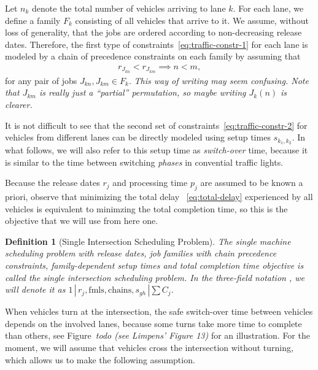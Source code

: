 \documentclass{article}
\theoremstyle{definition}
\theoremstyle{plain}
\newtheorem{define}{Definition}[section]
\begin{document}
Let $n_{k}$ denote the total number of vehicles arriving to lane $k$. For each
lane, we define a family $F_{k}$ consisting of all vehicles that arrive to it.
We assume, without loss of generality, that the jobs are ordered according to
non-decreasing release dates. Therefore, the first type of
constraints~\eqref{eq:traffic-constr-1} for each lane is modeled by a chain
of precedence constraints on each family by assuming that
\begin{align*}
  r_{J_{kn}} < r_{J_{km}} \implies n < m ,
\end{align*}
for any pair of jobs $J_{kn}, J_{km} \in F_{k}$. \textit{\color{blue}This way of writing may seem confusing. Note that $J_{km}$ is really just a ``partial'' permutation, so maybe writing $J_{k}(n)$ is clearer.}

It is not difficult to see
that the second set of constraints~\eqref{eq:traffic-constr-2} for vehicles from
different lanes can be directly modeled using setup times $s_{k_{1},k_{2}}$. In
what follows, we will also refer to this setup time as \textit{switch-over}
time, because it is similar to the time between switching \textit{phases} in
convential traffic lights.

Because the release dates $r_{j}$ and processing time $p_{j}$ are assumed to be
known a priori, observe that minimizing the total delay ~\eqref{eq:total-delay}
experienced by all vehicles is equivalent to minimzing the total completion time,
so this is the objective that we will use from here one.

\begin{define}[Single Intersection Scheduling Problem]
  \label{def:single-problem}
  The single machine scheduling problem with release dates, job families with
  chain precedence constraints, family-dependent setup times and total
  completion time objective is called the {\normalfont single intersection
    scheduling problem}. In the three-field notation
  \cite{grahamOptimizationApproximationDeterministic1979}, we will denote it as
  $1 \, | \, r_{j}, \text{fmls}, \text{chains}, s_{gh} \, | \sum C_{j}$.
\end{define}

When vehicles turn at the intersection, the safe switch-over time between
vehicles depends on the involved lanes, because some turns take more time to
complete than others, see Figure~\textit{\color{blue}todo (see Limpens' Figure
  13)} for an illustration. For the moment, we will assume that vehicles cross
the intersection without turning, which allows us to make the following
assumption.
\end{document}
